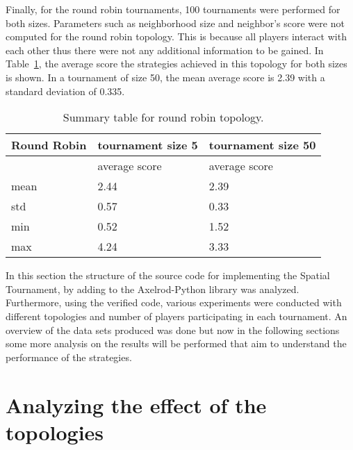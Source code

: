 Finally, for the round robin tournaments, 100 tournaments were performed for both
sizes. Parameters such as neighborhood size and neighbor's score
were not computed for the round robin topology. This is because all players
interact with each other thus there were not any additional information to be
gained. In Table~\ref{sum-rr}, the average score the strategies achieved
in this topology for both sizes is shown. In a tournament of size 50, the mean average
score is 2.39 with a standard deviation of 0.335.

\begin{table}[H]
	\centering
	\begin{tabular}{|l|l|l|}
		\hline
		Round Robin & \multicolumn{1}{c|}{tournament size 5} & \multicolumn{1}{c|}{tournament size 50} \\ \hline

		            & average score                          & average score                           \\ \hline
		mean        & 2.44                                   & 2.39                                    \\ \hline
		std         & 0.57                                   & 0.33                                    \\ \hline
		min         & 0.52                                   & 1.52                                    \\ \hline
		max         & 4.24                                   & 3.33                                    \\ \hline
	\end{tabular}
	\caption{Summary table for round robin topology.}
	\label{sum-rr}
\end{table}

In this section the structure of the source code for implementing the Spatial
Tournament, by adding to the Axelrod-Python library was analyzed. Furthermore,
using the verified code, various experiments were conducted with different
topologies
and number of players participating in each tournament. An overview of the
data sets produced was done but now in the following sections
some more analysis on the results will be performed that aim to understand
the performance of the strategies.


\section{Analyzing the effect of the topologies}
\label{sub:analyzing_the_effect_of_the_topologies}

